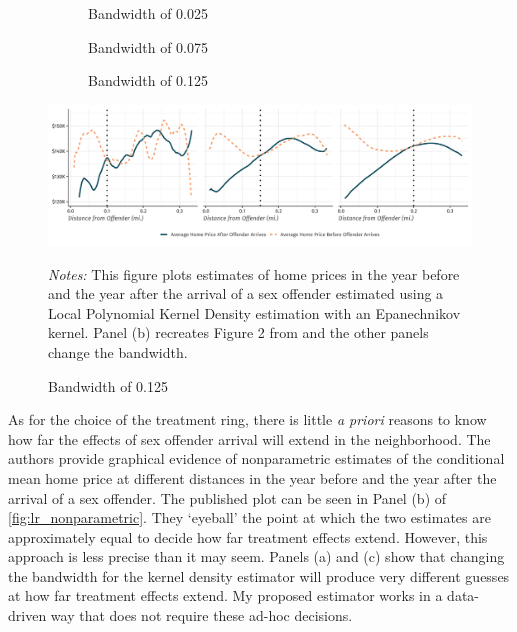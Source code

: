 \documentclass[12pt]{article}
\begin{document}
\begin{figure}[htb!]
    \caption{Price Gradient of Distance from Offender}\label{fig:lr_nonparametric}


    \begin{subfigure}{0.33\textwidth}
        \caption{Bandwidth of 0.025}
    \end{subfigure}
    \begin{subfigure}{0.33\textwidth}
        \caption{Bandwidth of 0.075}
    \end{subfigure}
    \begin{subfigure}{0.33\textwidth}
        \caption{Bandwidth of 0.125}
    \end{subfigure}
    
    \vspace{-3mm}
    \includegraphics[width=\textwidth]{../../figures/linden_rockoff_nonparametric.pdf}
    

    {\footnotesize{\it Notes:} This figure plots estimates of home prices in the year before and the year after the arrival of a sex offender estimated using a Local Polynomial Kernel Density estimation with an Epanechnikov kernel. Panel (b) recreates Figure 2 from \citet{Linden_Rockoff_2008} and the other panels change the bandwidth.}
\end{figure}

As for the choice of the treatment ring, there is little \emph{a priori} reasons to know how far the effects of sex offender arrival will extend in the neighborhood. The authors provide graphical evidence of nonparametric estimates of the conditional mean home price at different distances in the year before and the year after the arrival of a sex offender. The published plot can be seen in Panel (b) of \autoref{fig:lr_nonparametric}. They `eyeball' the point at which the two estimates are approximately equal to decide how far treatment effects extend. However, this approach is less precise than it may seem. Panels (a) and (c) show that changing the bandwidth for the kernel density estimator will produce very different guesses at how far treatment effects extend. My proposed estimator works in a data-driven way that does not require these ad-hoc decisions.
\end{document}
